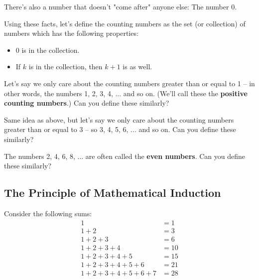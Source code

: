 There's also a number that doesn't "come after" anyone else: The number 0.

Using these facts, let's define the counting numbers as the set (or collection) of numbers which has the following properties:

\begin{itemize}
\item 0 is in the collection.
\item If $k$ is in the collection, then $k+1$ is as well. 
\end{itemize}

\begin{exercise}
Let's say we only care about the counting numbers greater than or equal to 1 -- in other words, the numbers 1, 2, 3, 4, ... and so on. (We'll call these the \textbf{positive counting numbers}.) Can you define these similarly?
\end{exercise}

\begin{exercise}
Same idea as above, but let's say we only care about the counting numbers greater than or equal to 3 -- so 3, 4, 5, 6, ... and so on. Can you define these similarly?
\end{exercise}

\begin{exercise}
The numbers 2, 4, 6, 8, ... are often called the \textbf{even numbers}. Can you define these similarly?
\end{exercise}


\subsection{The Principle of Mathematical Induction}

Consider the following sums:
\begin{align*}
1 &= 1 \\
1 + 2 &= 3 \\
1 + 2 + 3 &= 6 \\
1 + 2 + 3 + 4 &= 10 \\
1 + 2 + 3 + 4 + 5 &= 15 \\
1 + 2 + 3 + 4 + 5 + 6 &= 21 \\
1 + 2 + 3 + 4 + 5 + 6 + 7 &= 28 \\
\end{align*}

